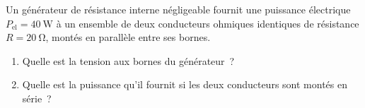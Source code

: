 Un générateur de résistance interne négligeable fournit une puissance électrique
$P_{\text{el}}=\qty{40}{\watt}$ à un ensemble de deux conducteurs ohmiques
identiques de résistance $R=\qty{20}{\ohm}$, montés en parallèle entre ses
bornes.
\begin{enumerate}
    \item Quelle est la tension aux bornes du générateur~?
    \item Quelle est la puissance qu'il fournit si les deux conducteurs sont
          montés en série~?
\end{enumerate}

